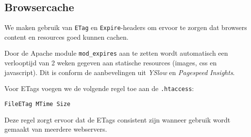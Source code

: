 \subsection{Browsercache}

We maken gebruik van \texttt{ETag} en \texttt{Expire}-headers om ervoor te zorgen dat browsers content en resources goed kunnen cachen.

Door de Apache module \texttt{mod\_expires} aan te zetten wordt automatisch een verlooptijd van 2 weken gegeven aan statische resources (images, css en javascript). Dit is conform de aanbevelingen uit \emph{YSlow} en \emph{Pagespeed Insights}.

Voor ETags voegen we de volgende regel toe aan de \texttt{.htaccess}:
\begin{verbatim}
FileETag MTime Size
\end{verbatim}
Deze regel zorgt ervoor dat de ETags consistent zijn wanneer gebruik wordt gemaakt van meerdere webservers.